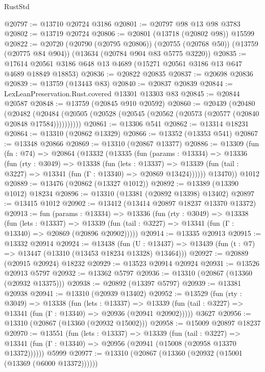 \begin{lexlean}{RustStd}
\begin{coremodule}
@20797 := @13710 @20724 @3186
@20801 := @20797 @98 @13 @98 @3783
@20802 := @13719 @20724
@20806 := @20801 (@13718 (@20802 @98)) @15599
@20822 := @20720
    (@20790 (@20795 @20806))
    (@20755 (@20768 @50))
    (@13759 (@20775 @84 @904))
    (@13634 (@20784 @904 @83 @5775 @3220))
@20835 := @17614 @20561 @3186 @648 @13 @4689 (@15271 @20561 @3186 @13 @647 @4689 @18849 @18853)
@20836 := @20822 @20835
@20837 := @20698 @20836
@20839 := @13759 (@13443 @83)
@20840 := @20837 @20839
@20844 := LexLeanPreservation.Rust.covered @13301 @13303 @83
@20845 := @20844 @20587
@20848 := @13759 (@20845 @910 @20592)
@20860 := @20439
    (@20480
      (@20482
        (@20484 (@20505 (@20528 (@20545 (@20562 (@20573 (@20577 (@20840 @20848 @17584))))))))))
@20861 := @13306 @541
@20862 := @13314 @18231
@20864 := @13310 (@20862 @13329)
@20866 := @13352 (@13353 @541)
@20867 := @13348 @20866
@20869 := @13310 (@20867 @13377)
@20886 := @13309
    (fun (fn : @74) =>
    @20864
      (@13332
        (@13335
          (fun (params : @13334) =>
          @13336
            (fun (rty : @3049) =>
            @13338
              (fun (lets : @13337) =>
              @13339 (fun (tail : @3227) => @13341 (fun (Γ : @13340) => @20869 @13424))))))
        @13470))
    @1012
@20889 := @13476 (@20862 (@13327 @1012))
@20892 := @13389 (@13390 @1012) @18234
@20896 := @13310 (@13381 (@20892 @13398) @13402)
@20897 := @13415 @1012
@20902 := @13412 (@13414 @20897 @18237 @13370 @13372)
@20913 := fun (params : @13334) =>
  @13336
    (fun (rty : @3049) =>
    @13338
      (fun (lets : @13337) =>
      @13339 (fun (tail : @3227) => @13341 (fun (Γ : @13340) => @20869 (@20896 @20902)))))
@20914 := @13335 @20913
@20915 := @13332 @20914
@20924 := @13438
    (fun (U : @13437) => @13439 (fun (t : @7) => @13447 (@13310 (@13453 @18234 @13328) @13464)))
@20927 := @20889 (@20915 @20924) @18232
@20929 := @13523 @20914 @20924
@20931 := @13526 @20913 @5797
@20932 := @13362 @5797
@20936 := @13310 (@20867 (@13360 (@20932 @13375)))
@20938 := @20892 (@13397 @5797)
@20939 := @13381 @20938
@20941 := @13310 (@20939 @13402)
@20952 := @13529
    (fun (rty : @3049) =>
    @13338
      (fun (lets : @13337) =>
      @13339 (fun (tail : @3227) => @13341 (fun (Γ : @13340) => @20936 (@20941 @20902)))))
    @3627
@20956 := @13310 (@20867 (@13360 (@20932 @15002)))
@20958 := @15009 @20897 @18237
@20970 := @13551
    (fun (lets : @13337) =>
    @13339
      (fun (tail : @3227) =>
      @13341 (fun (Γ : @13340) => @20956 (@20941 (@15008 (@20958 @13370 @13372))))))
    @5999
@20977 := @13310 (@20867 (@13360 (@20932 (@15001 (@13369 (@6000 @13372))))))

\end{coremodule}
\end{lexlean}
